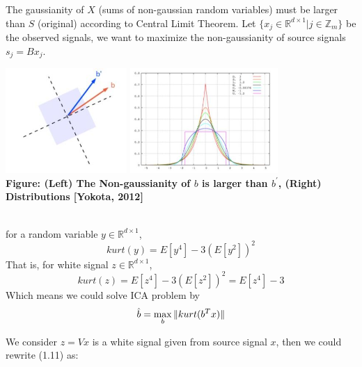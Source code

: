 \documentclass[a4 paper]{article}
\begin{document}
\par The gaussianity of $X$ (sums of non-gaussian random variables) must be larger than $S$ (original) according to Central Limit Theorem.
Let $\{x_j\in\mathbb{R}^{d\times1}|j\in\mathbb{Z}_m\}$ be the observed signals, we want to maximize the non-gaussianity of source signals $s_j=Bx_j$.\\
\begin{center}
    \includegraphics[height=4cm]{figure/nongaussianity.JPG}
    \includegraphics[height=4cm]{figure/distribution.JPG}\\
    \textbf{Figure:  (Left) The Non-gaussianity of $b$ is larger than $b^{'}$, (Right) Distributions [Yokota, 2012]}
\end{center}
\begin{tcolorbox}[colback=RoyalBlue!5!white,colframe=RoyalBlue!75!black,title=Kurtosis is a measure of non-gaussianity]
    \\
        for a random variable $y\in\mathbb{R}^{d\times 1}$,
       $$kurt(y)=E[y^4]-3(E[y^2])^2$$
    \tcblower
    That is, for white signal $z\in\mathbb{R}^{d\times1}$, $$kurt(z)=E[z^4]-3(E[z^2])^2=E[z^4]-3$$
    Which means we could solve ICA problem by
    \begin{equation}
        \hat{b}=\max_{b}\large\|kurt(b^Tx)\large\|
    \end{equation}
\end{tcolorbox}
We consider $z=Vx$ is a white signal given from source signal $x$, then we could rewrite (1.11) as: 
\end{document}
